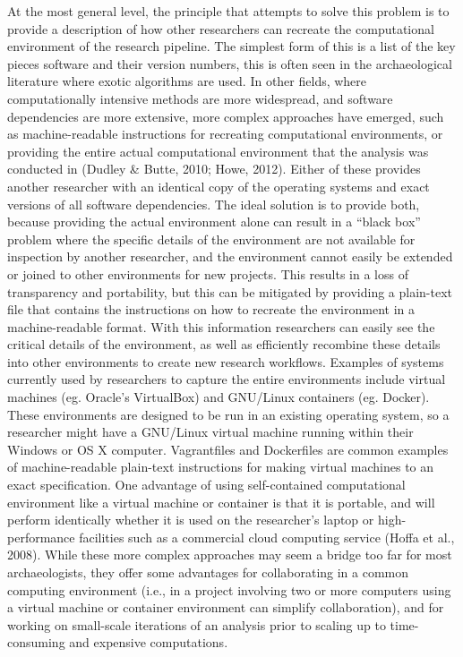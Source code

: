 \documentclass[american,man]{apa6}
\begin{document}
At the most general level, the principle that attempts to solve this
problem is to provide a description of how other researchers can
recreate the computational environment of the research pipeline. The
simplest form of this is a list of the key pieces software and their
version numbers, this is often seen in the archaeological literature
where exotic algorithms are used. In other fields, where computationally
intensive methods are more widespread, and software dependencies are
more extensive, more complex approaches have emerged, such as
machine-readable instructions for recreating computational environments,
or providing the entire actual computational environment that the
analysis was conducted in (Dudley \& Butte, 2010; Howe, 2012). Either of
these provides another researcher with an identical copy of the
operating systems and exact versions of all software dependencies. The
ideal solution is to provide both, because providing the actual
environment alone can result in a \enquote{black box} problem where the
specific details of the environment are not available for inspection by
another researcher, and the environment cannot easily be extended or
joined to other environments for new projects. This results in a loss of
transparency and portability, but this can be mitigated by providing a
plain-text file that contains the instructions on how to recreate the
environment in a machine-readable format. With this information
researchers can easily see the critical details of the environment, as
well as efficiently recombine these details into other environments to
create new research workflows. Examples of systems currently used by
researchers to capture the entire environments include virtual machines
(eg. Oracle's VirtualBox) and GNU/Linux containers (eg. Docker). These
environments are designed to be run in an existing operating system, so
a researcher might have a GNU/Linux virtual machine running within their
Windows or OS X computer. Vagrantfiles and Dockerfiles are common
examples of machine-readable plain-text instructions for making virtual
machines to an exact specification. One advantage of using
self-contained computational environment like a virtual machine or
container is that it is portable, and will perform identically whether
it is used on the researcher's laptop or high-performance facilities
such as a commercial cloud computing service (Hoffa et al., 2008). While
these more complex approaches may seem a bridge too far for most
archaeologists, they offer some advantages for collaborating in a common
computing environment (i.e., in a project involving two or more
computers using a virtual machine or container environment can simplify
collaboration), and for working on small-scale iterations of an analysis
prior to scaling up to time-consuming and expensive computations.
\end{document}
